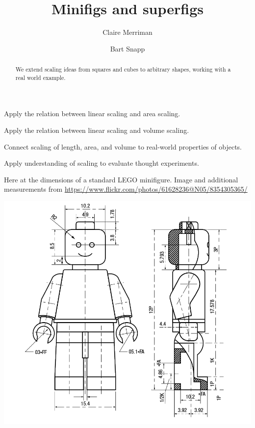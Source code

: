 \documentclass[handout,nooutcomes,noauthor,hints,12pt]{ximera}
\title{Minifigs and superfigs}
\author{Claire Merriman \and Bart Snapp}
\begin{document}
\begin{abstract}
  We extend scaling ideas from squares and cubes to arbitrary shapes,
  working with a real world example.
\end{abstract}
\maketitle

\begin{listOutcomes}
\item Apply the relation between linear scaling and area scaling.
\item Apply the relation between linear scaling and volume scaling.
\item Connect scaling of length, area, and volume to real-world properties of objects.
\item Apply understanding of scaling to evaluate thought experiments.
\end{listOutcomes}


Here at the dimensions of a standard LEGO minifigure. Image and
additional measurements from
\url{https://www.flickr.com/photos/61628236@N05/8354305365/}
\begin{center}
 \includegraphics[height=.55\textheight]{lego-minifigure.png}
\end{center}
\end{document}
